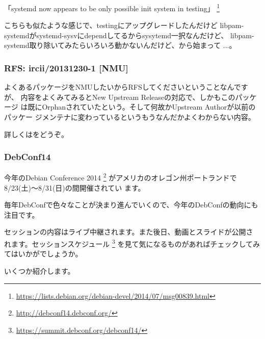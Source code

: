 \documentclass[mingoth,a4paper]{jsarticle}
\begin{document}
「systemd now appears to be only possible init system in testing」
\footnote{\url{https://lists.debian.org/debian-devel/2014/07/msg00839.html}}

こちらも似たような感じで、testingにアップグレードしたんだけど
libpam-systemdがsystemd-sysvにdependしてるからsysytemd一択なんだけど、
libpam-systemd取り除いてみたらいろいろ動かないんだけど、から始まって
...。


\subsubsection{RFS: ircii/20131230-1 [NMU]}

よくあるパッケージをNMUしたいからRFSしてくださいということなんですが、
内容をよくみてみるとNew Upstream Releaseの対応で、しかもこのパッケージ
は既にOrphanされていたという。そして何故かUpstream Authorが以前のパッケー
ジメンテナに変わっているというもうなんだかよくわからない内容。

詳しくはをどうぞ。


\subsubsection{DebConf14}

今年のDebian Conference 2014
\footnote{\url{http://debconf14.debconf.org/}}
がアメリカのオレゴン州ポートランドで8/23(土)〜8/31(日)の間開催されてい
ます。

毎年DebConfで色々なことが決まり進んでいくので、今年のDebConfの動向にも
注目です。

セッションの内容はライブ中継されます。また後日、動画とスライドが公開さ
れます。セッションスケジュール
\footnote{\url{https://summit.debconf.org/debconf14/}}
を見て気になるものがあればチェックしてみてはいかがでしょうか。

いくつか紹介します。
\end{document}
